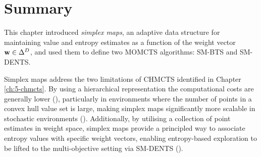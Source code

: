 










\section{Summary}
\label{sec:6-6-summary}

    This chapter introduced \textit{simplex maps}, an 
    adaptive data structure for maintaining value and 
    entropy estimates as a function of the weight vector 
    $\mathbf{w}\in\Delta^D$, and used them to define two 
    MOMCTS algorithms: SM-BTS and SM-DENTS.

    Simplex maps address the two limitations of CHMCTS 
    identified in Chapter \ref{ch:5-chmcts}. By using a hierarchical representation the computational costs are generally lower (\complexityq), particularly in environments where the number of points in a convex hull value set is large, making 
    simplex maps significantly more scalable in stochastic 
    environments (\stochq). Additionally, by utilising a collection of point estimates in weight space, simplex maps provide a principled 
    way to associate entropy values with specific weight 
    vectors, enabling entropy-based exploration to be 
    lifted to the multi-objective setting via SM-DENTS (\contextq).

